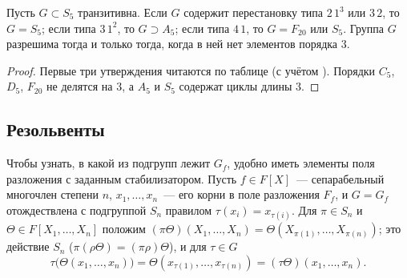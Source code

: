 \begin{corollary}[4.18b]
Пусть $G\subset S_5$ транзитивна. Если $G$ содержит перестановку типа $2\,1^3$ или $3\,2$, то $G=S_5$; если типа
$3\,1^2$, то $G\supset A_5$; если типа $4\,1$, то $G=F_{20}$ или $S_5$. Группа $G$ разрешима тогда и только тогда, когда
в ней нет элементов порядка $3$.
\end{corollary}

\begin{proof}
Первые три утверждения читаются по таблице (с учётом ). Порядки $C_5$, $D_5$, $F_{20}$ не делятся на $3$, а $A_5$ и
$S_5$ содержат циклы длины $3$.
\end{proof}

\subsection*{Резольвенты}

Чтобы узнать, в какой из подгрупп лежит $G_f$, удобно иметь элементы поля разложения с заданным стабилизатором.
Пусть $f\in F[X]$~--- сепарабельный многочлен степени $n$, $x_1,\dots,x_n$~--- его корни в поле разложения $F_f$, и
$G=G_f$ отождествлена с подгруппой $S_n$ правилом $\tau(x_i)=x_{\tau(i)}$. Для $\pi\in S_n$ и $\Theta\in F[X_1,\dots,X_n]$
положим $(\pi\Theta)(X_1,\dots,X_n)=\Theta(X_{\pi(1)},\dots,X_{\pi(n)})$; это действие $S_n$
($\pi(\rho\Theta)=(\pi\rho)\Theta$), и для $\tau\in G$
\begin{equation}\label{eq:c4-res1}
\tau\bigl(\Theta(x_1,\dots,x_n)\bigr)=\Theta(x_{\tau(1)},\dots,x_{\tau(n)})=(\tau\Theta)(x_1,\dots,x_n).
\end{equation}

